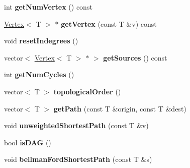 \begin{DoxyCompactItemize}
\item 
\hypertarget{class_graph_a295932f117d92c825a97ec458e0fb332}{}int {\bfseries get\+Num\+Vertex} () const \label{class_graph_a295932f117d92c825a97ec458e0fb332}

\item 
\hypertarget{class_graph_a08a95472b0d9bd7321660940807af060}{}\hyperlink{class_vertex}{Vertex}$<$ T $>$ $\ast$ {\bfseries get\+Vertex} (const T \&v) const \label{class_graph_a08a95472b0d9bd7321660940807af060}

\item 
\hypertarget{class_graph_af34eb86d804272e6e3e221a9ed688c53}{}void {\bfseries reset\+Indegrees} ()\label{class_graph_af34eb86d804272e6e3e221a9ed688c53}

\item 
\hypertarget{class_graph_aa1a3c754f51a888e25dff2b26dfb85fc}{}vector$<$ \hyperlink{class_vertex}{Vertex}$<$ T $>$ $\ast$ $>$ {\bfseries get\+Sources} () const \label{class_graph_aa1a3c754f51a888e25dff2b26dfb85fc}

\item 
\hypertarget{class_graph_a694dff81073c38b669057f0c6bd4cbb1}{}int {\bfseries get\+Num\+Cycles} ()\label{class_graph_a694dff81073c38b669057f0c6bd4cbb1}

\item 
\hypertarget{class_graph_a2e75512c089c3916dda9cf61e1185d9d}{}vector$<$ T $>$ {\bfseries topological\+Order} ()\label{class_graph_a2e75512c089c3916dda9cf61e1185d9d}

\item 
\hypertarget{class_graph_ab4054ca572c10669dd3e05d6d41c116c}{}vector$<$ T $>$ {\bfseries get\+Path} (const T \&origin, const T \&dest)\label{class_graph_ab4054ca572c10669dd3e05d6d41c116c}

\item 
\hypertarget{class_graph_ae5264597aacaf4f45819e96a6d6c89aa}{}void {\bfseries unweighted\+Shortest\+Path} (const T \&v)\label{class_graph_ae5264597aacaf4f45819e96a6d6c89aa}

\item 
\hypertarget{class_graph_ab49d07c2bd6b8b30d5ae82bc558b821a}{}bool {\bfseries is\+D\+A\+G} ()\label{class_graph_ab49d07c2bd6b8b30d5ae82bc558b821a}

\item 
\hypertarget{class_graph_a1d6769b79beaa76f78fd9c9209833bef}{}void {\bfseries bellman\+Ford\+Shortest\+Path} (const T \&s)\label{class_graph_a1d6769b79beaa76f78fd9c9209833bef}


\end{DoxyCompactItemize}
